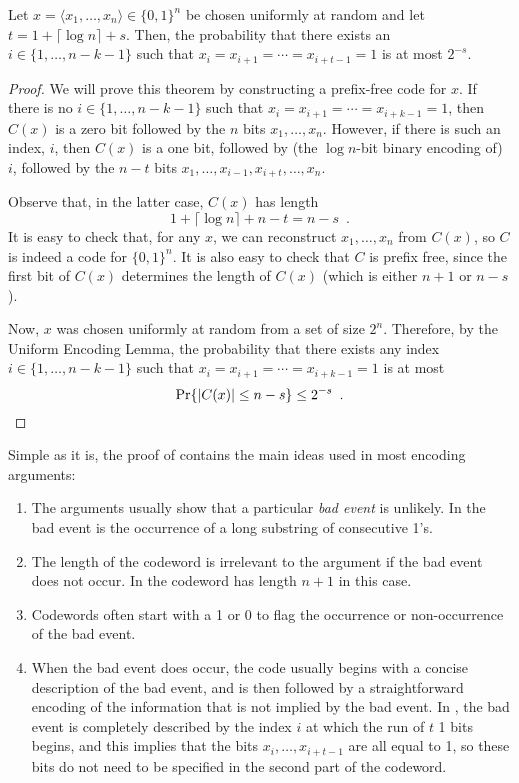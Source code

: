 \documentclass{patmorin}
\begin{document}
\begin{thm}
  Let $x=\langle x_1,\ldots,x_n\rangle\in\{0,1\}^n$ be chosen
  uniformly at random and let $t=1+\lceil\log n\rceil + s$. Then, the
  probability that there exists an $i\in\{1,\ldots,n-k-1\}$ such that
  $x_i=x_{i+1}=\cdots=x_{i+t-1}=1$ is at most $2^{-s}$.
\end{thm}

\begin{proof}
  We will prove this theorem by constructing a prefix-free code
  for $x$. If there is no $i\in\{1,\ldots,n-k-1\}$ such that
  $x_i=x_{i+1}=\cdots=x_{i+k-1}=1$, then $C(x)$ is a zero bit
  followed by the $n$ bits $x_1,\ldots,x_n$.  However, if there is
  such an index, $i$, then $C(x)$ is a one bit, followed by (the
  $\log n$-bit binary encoding of) $i$, followed by the $n-t$ bits
  $x_1,\ldots,x_{i-1},x_{i+t},\ldots,x_n$.

  Observe that, in the latter case, $C(x)$ has length 
  \[
      1 + \lceil\log n\rceil + n - t = n-s \enspace .
  \]
  It is easy to check that, for any $x$, we can reconstruct
  $x_1,\ldots,x_n$ from $C(x)$, so $C$ is indeed a code for $\{0,1\}^n$.
  It is also easy to check that $C$ is prefix free, since the first bit of
  $C(x)$ determines the length of $C(x)$ (which is either $n+1$ or $n-s$).

  Now, $x$ was chosen uniformly at random from a set of size $2^{n}$.
  Therefore, by the Uniform Encoding Lemma, the probability
  that there exists any index $i\in\{1,\ldots,n-k-1\}$ such that
  $x_i=x_{i+1}=\cdots=x_{i+k-1}=1$ is at most
  \[
      \Pr\{|C(x)|\le n-s\} \le 2^{-s} \enspace . \qedhere 
  \]
\end{proof}

Simple as it is, the proof of  contains the main ideas
used in most encoding arguments:

\begin{enumerate}
  \item The arguments usually show that a particular \emph{bad event}
  is unlikely.  In  the bad event is the occurrence of a long
  substring of consecutive 1's.

  \item The length of the codeword is irrelevant to the argument if
  the bad event does not occur.  In 
  the codeword has length $n+1$ in this case.
 
  \item Codewords often start with a 1 or 0 to flag the occurrence or
  non-occurrence of the bad event.

  \item When the bad event does occur, the code usually begins with
  a concise description of the bad event, and is then followed by a
  straightforward encoding of the information that is not implied by the
  bad event. In , the bad event is completely described
  by the index $i$ at which the run of $t$ 1 bits begins, and this implies
  that the bits $x_i,\ldots,x_{i+t-1}$ are all equal to 1, so these
  bits do not need to be specified in the second part of the codeword. 
\end{enumerate}
\end{document}
